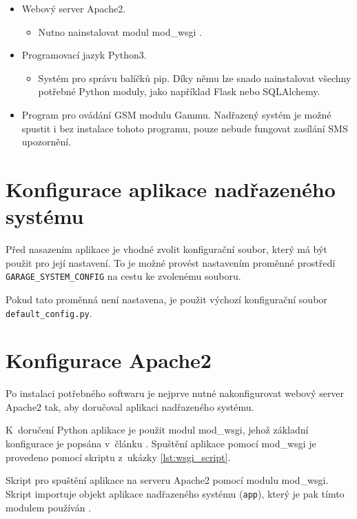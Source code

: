 \begin{itemize}
    \item Webový server Apache2.
    \begin{itemize}
        \item Nutno nainstalovat modul mod\_wsgi  \cite{mod_wsgi}.
    \end{itemize}
    \item Programovací jazyk Python3.
    \begin{itemize}
        \item Systém pro správu balíčků pip. Díky němu lze snado nainstalovat všechny potřebné Python moduly, jako například Flask nebo SQLAlchemy.
    \end{itemize}
    \item Program pro ovádání GSM modulu Gammu. Nadřazený systém je možné spustit i bez instalace tohoto programu, pouze nebude fungovat zasílání SMS upozornění.
\end{itemize}

\section{Konfigurace aplikace nadřazeného systému}
\label{sec:dp_appconfig}

Před nasazením aplikace je vhodné zvolit konfigurační soubor, který má být použit pro její nastavení. To je možné provést nastavením proměnné prostředí \texttt{GARAGE\_SYSTEM\_CONFIG} na cestu ke zvolenému souboru.

Pokud tato proměnná není nastavena, je použit výchozí konfigurační soubor \texttt{default\_config.py}.

\newpage

\section{Konfigurace Apache2}

Po instalaci potřebného softwaru je nejprve nutné nakonfigurovat webový server Apache2 tak, aby doručoval aplikaci nadřazeného systému. 

K~doručení Python aplikace je použit modul mod\_wsgi, jehož základní konfigurace je popsána v~článku \cite{flask_wsgi}. Spuštění aplikace pomocí mod\_wsgi je provedeno pomocí skriptu z~ukázky \ref{lst:wsgi_script}.

\begin{listing}[htbp]
\caption{\label{lst:wsgi_script} Skript pro spuštění aplikace na serveru Apache2 pomocí modulu mod\_wsgi. Skript importuje objekt aplikace nadřazeného systému (\texttt{app}), který je pak tímto modulem používán \cite{flask_wsgi}.}
\inputminted[bgcolor=codebg]{python}{source-samples/wsgi.py}
\end{listing}

